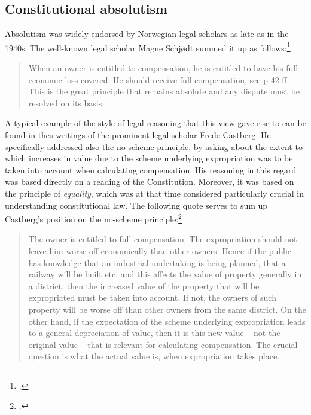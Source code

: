 \subsection{Constitutional absolutism}

Absolutism was widely endorsed by Norwegian legal scholars as late as in the 1940s. The well-known legal scholar Magne Schjødt summed it up as follows:\footcite[177]{schjodt47}

\begin{quote}
When an owner is entitled to compensation, he is entitled to have his full economic loss covered. He should receive full compensation, see p 42 ff. This is the great principle that remains absolute and any dispute must be resolved on its basis.
\end{quote}

A typical example of the style of legal reasoning that this view gave rise to can be found in thes writings of the prominent legal scholar Frede Castberg. He specifically addressed also the no-scheme principle, by asking about the extent to which increases in value due to the scheme underlying expropriation was to be taken into account when calculating compensation. His reasoning in this regard was based directly on a reading of the Constitution. Moreover, it was based on the principle of \emph{equality}, which was at that time considered particularly crucial in understanding constitutional law. The following quote serves to sum up Castberg's position on the no-scheme principle:\footcite[268]{castberg64b}

\begin{quote}
The owner is entitled to full compensation. The expropriation should not leave him worse off economically than other owners. Hence if the public has knowledge that an industrial undertaking is being planned, that a railway will be built etc, and this affects the value of property generally in a district, then the increased value of the property that will be expropriated must be taken into account. If not, the owners of such property will be worse off than other owners from the same district. On the other hand, if the expectation of the scheme underlying expropriation leads to a general depreciation of value, then it is this new value -- not the original value -- that is relevant for calculating compensation. The crucial question is what the actual value is, when expropriation takes place.
\end{quote}

